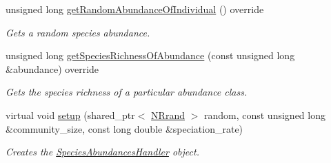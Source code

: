 \begin{DoxyCompactItemize}
unsigned long \hyperlink{class_simulated_species_abundances_handler_a0a01ec5baee3fb9c12185b6d672a6c72}{get\+Random\+Abundance\+Of\+Individual} () override
\begin{DoxyCompactList}\small\item\em Gets a random species abundance. \end{DoxyCompactList}\item 
unsigned long \hyperlink{class_simulated_species_abundances_handler_a274112c16a17f739b8c751ae81d01cbf}{get\+Species\+Richness\+Of\+Abundance} (const unsigned long \&abundance) override
\begin{DoxyCompactList}\small\item\em Gets the species richness of a particular abundance class. \end{DoxyCompactList}\item 
virtual void \hyperlink{class_species_abundances_handler_ad98b28d7d70e8e1281f0e9acb5b419fd}{setup} (shared\+\_\+ptr$<$ \hyperlink{class_n_rrand}{N\+Rrand} $>$ random, const unsigned long \&community\+\_\+size, const long double \&speciation\+\_\+rate)
\begin{DoxyCompactList}\small\item\em Creates the \hyperlink{class_species_abundances_handler}{Species\+Abundances\+Handler} object. \end{DoxyCompactList}\end{DoxyCompactItemize}
